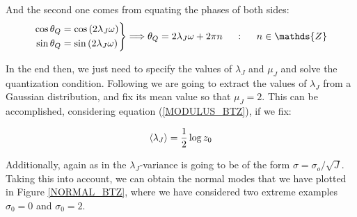 \documentclass[11pt,a4paper]{article}
\begin{document}
{{\noindent And the second one comes from equating the phases of both sides:}
\begin{equation}
    \left.\begin{aligned}
        \cos{\theta_Q} &= \cos{\left(2\lambda_J\w\right)}\\
        \sin{\theta_Q} &= \sin{\left(2\lambda_J\w\right)}
    \end{aligned}\right\}\Longrightarrow \theta_Q = 2\lambda_J\omega +2\pi n ~~~~:~~~~ n\in\mathds{Z}
\end{equation}

In the end then, we just need to specify the values of $\lambda_J$ and $\mu_J$ and solve the quantization condition. Following \cite{Jeong_2025,Das_2023,das2023fuzzballsrandommatrices} we are going to extract the values of $\lambda_J$ from a Gaussian distribution, and fix its mean value so that $\mu_J=2$. This can be accomplished, considering equation (\ref{MODULUS_BTZ}), if we fix:

\begin{equation}
    \langle\lambda_J\rangle = \frac{1}{2}\log z_0
\end{equation}

{\noindent Additionally, again as in \cite{Jeong_2025,Das_2023,das2023fuzzballsrandommatrices} the $\lambda_J$-variance is going to be of the form $\sigma = \sigma_o/\sqrt{J}$. Taking this into account, we can obtain the normal modes that we have plotted in Figure \ref{NORMAL_BTZ}, where we have considered two extreme examples $\sigma_0=0$ and $\sigma_0=2$}.

}
\end{document}
